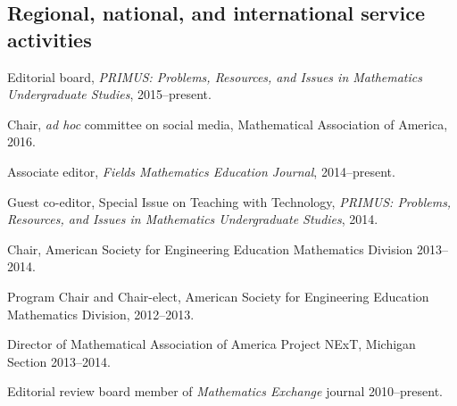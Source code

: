 \documentclass[letterpaper]{article}
\renewenvironment{itemize}{
  \begin{list}{}{
    \setlength{\leftmargin}{1.5em}
	\setlength{\itemsep}{0in}
  }
}{
  \end{list}
}
\begin{document}
\subsection*{Regional, national, and international service activities}
\begin{itemize}
	\item Editorial board, \emph{PRIMUS: Problems, Resources, and Issues in Mathematics Undergraduate Studies}, 2015--present.
	\item Chair, \emph{ad hoc} committee on social media, Mathematical Association of America, 2016. 
	\item Associate editor, \emph{Fields Mathematics Education Journal}, 2014--present. 
	\item Guest co-editor, Special Issue on Teaching with Technology, \emph{PRIMUS: Problems, Resources, and Issues in Mathematics Undergraduate Studies}, 2014.
	\item Chair, American Society for Engineering Education Mathematics Division 2013--2014. 
	\item Program Chair and Chair-elect, American Society for Engineering Education Mathematics Division, 2012--2013. 
	\item Director of Mathematical Association of America Project NExT, Michigan Section 2013--2014. 
	\item Editorial review board member of \emph{Mathematics Exchange} journal 2010--present. 
\end{itemize}
\end{document}
